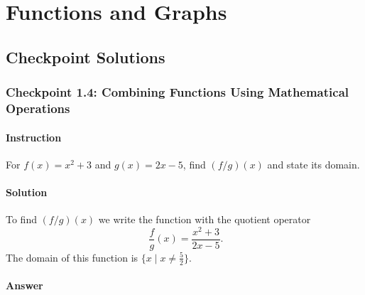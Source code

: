 \documentclass[11pt, letterpaper, oneside]{memoir}
\begin{document}
\chapter{Functions and Graphs}

\section*{Checkpoint Solutions}










\subsection*{Checkpoint 1.4: Combining Functions Using Mathematical Operations}

\subsubsection{Instruction}

For $ f(x) = x^2 + 3 $ and $ g(x) = 2x - 5 $, find $ (f/g)(x) $ and state its domain.

\subsubsection{Solution}

To find $ (f/g)(x) $ we write the function with the quotient operator
$$ \phantom{.}
\frac{f}{g}(x) = \frac{x^2 + 3}{2x - 5}
.$$
The domain of this function is $ \{ x \mid x \ne \frac{5}{2} \} $.

\subsubsection{Answer}
\end{document}
